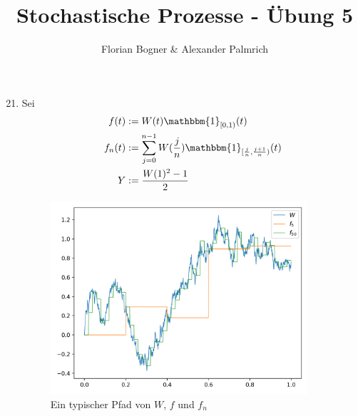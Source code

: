 \documentclass[a4paper,11pt,notitlepage,fullpage]{article}
\newcommand{\indd}[1]{\mathbbm{1}_{#1}}
\begin{document}
\author{Florian Bogner \& Alexander Palmrich}
\title{Stochastische Prozesse - Übung 5}
\maketitle

\begin{enumerate}
\setcounter{enumi}{20}

\item Sei 
\begin{align*}
f(t) &:= W(t) \indd{[0,1)}(t)\\
f_n(t) &:= \sum_{j=0}^{n-1} W(\frac{j}{n}) \indd{[\frac{j}{n}, \frac{j+1}{n})}(t)\\
Y &:= \frac{W(1)^2-1}{2}
\end{align*}

\begin{figure}[h!]
\centering
\includegraphics[width=0.9\textwidth]{gfx/21_fig.png}
\caption{Ein typischer Pfad von $W$, $f$ und $f_n$}
\end{figure}


\end{enumerate}
\end{document}
